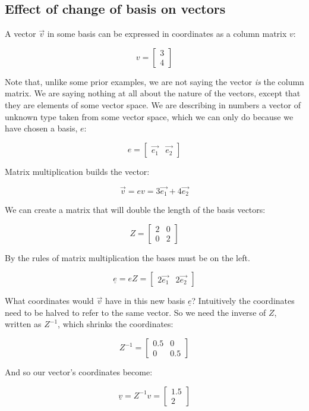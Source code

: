 \subsection{Effect of change of basis on vectors}

A vector $\vec{v}$ in some basis can be expressed in coordinates as a column matrix $v$:

$$v = \begin{bmatrix}3 \\ 4\end{bmatrix}$$

Note that, unlike some prior examples, we are not saying the vector \textit{is} the column matrix. We are saying nothing at all about the nature of the vectors, except that they are elements of some vector space. We are describing in numbers a vector of unknown type taken from some vector space, which we can only do because we have chosen a basis, $e$:

$$e = \begin{bmatrix}\vec{e_1} & \vec{e_2}\end{bmatrix}$$

Matrix multiplication builds the vector:

$$\vec{v} = ev = 3\vec{e_1} + 4\vec{e_2}$$

We can create a matrix that will double the length of the basis vectors:

$$Z = \begin{bmatrix}2 & 0 \\ 0 & 2\end{bmatrix}$$

By the rules of matrix multiplication the bases must be on the left.

$$\underline{e} = eZ = \begin{bmatrix}2\vec{e_1} & 2\vec{e_2}\end{bmatrix}$$

What coordinates would $\vec{v}$ have in this new basis $\underline{e}$? Intuitively the coordinates need to be halved to refer to the same vector. So we need the inverse of $Z$, written as $Z^{-1}$, which shrinks the coordinates:

$$Z^{-1} = \begin{bmatrix}0.5 & 0 \\ 0 & 0.5\end{bmatrix}$$

And so our vector's coordinates become:

$$\underline{v} = Z^{-1}v = \begin{bmatrix}1.5 \\ 2\end{bmatrix}$$


